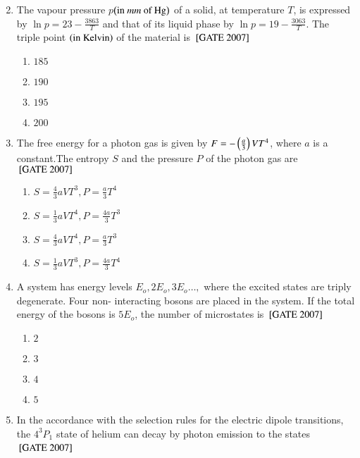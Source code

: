\documentclass[journal]{IEEEtran}
\begin{document}
\begin{enumerate}
\begin{multicols}{4}
\begin{enumerate}
\end{enumerate}
\end{multicols}
\item The vapour pressure $p$$\brak{\text{in  $mm$  of Hg}}$ of a solid, at temperature $T$, is expressed by $\ln{p}=23-\frac{3863}{T}$ and that of its liquid phase by $\ln{p}= 19-\frac{3063}{T}$. The triple point $\brak{\text{in  Kelvin}}$ of the material is \hfill{$\sbrak{\text{GATE 2007}}$} 
\begin{multicols}{4}
\begin{enumerate}
    \item $185$
    \item $190$
    \item $195$
    \item $200$
\end{enumerate}
\end{multicols}
\item The free energy for a photon gas is given by $F = -\brak{\frac{a}{3}}VT^4$, where $a$ is a constant.The entropy $S$ and the pressure $P$ of the photon gas are \hfill{$\sbrak{\text{GATE 2007}}$} 
\begin{multicols}{2}
\begin{enumerate}
    \item $S=\frac{4}{3}aVT^3, P=\frac{a}{3}T^4$
    \item $S=\frac{1}{3}aVT^4, P=\frac{4a}{3}T^3$
    \item $S=\frac{4}{3}aVT^4, P=\frac{a}{3}T^3$
    \item $S=\frac{1}{3}aVT^3, P=\frac{4a}{3}T^4$
\end{enumerate}
\end{multicols}
\item A system has energy levels $E_o,2E_o,3E_o\dots,$ where the excited states are triply degenerate. Four non- interacting bosons are placed in the system. If the total energy of the bosons is $5E_o$, the number of microstates is \hfill{$\sbrak{\text{GATE 2007}}$} 
\begin{multicols}{4}
\begin{enumerate}
    \item $2$
    \item $3$
    \item $4$
    \item $5$
\end{enumerate}
\end{multicols}
\item In the accordance with the selection rules for the electric dipole transitions, the $4^3P_1$ state of helium can decay by photon emission to the states \hfill{$\sbrak{\text{GATE 2007}}$} 
$$
\end{enumerate}
\end{document}
